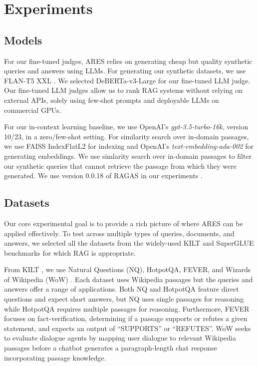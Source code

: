 
\section{Experiments}

\subsection{Models}
\label{sec:models}

For our fine-tuned judges,
ARES relies on generating cheap but quality synthetic queries and answers using LLMs.
For generating our synthetic datasets, we use FLAN-T5 XXL \cite{chung2022scaling}.
We selected DeBERTa-v3-Large \cite{he2021debertav3} for our fine-tuned LLM judge.
Our fine-tuned LLM judges allow us to rank RAG systems without relying on external APIs, solely using few-shot prompts and deployable LLMs on commercial GPUs.

For our in-context learning baseline, we use OpenAI's \textit{gpt-3.5-turbo-16k}, version 10/23, \cite{brown2020language} in a zero/few-shot setting.
For similarity search over in-domain passages, we use FAISS IndexFlatL2 for indexing \cite{johnson2019billion} and OpenAI's \textit{text-embedding-ada-002} for generating embeddings.
We use simlarity search over in-domain passages to filter our synthetic queries that cannot retrieve the passage from which they were generated.
We use version 0.0.18 of RAGAS in our experiments \cite{ragas2023}.



\subsection{Datasets}
\label{sec:datasets}

Our core experimental goal is to provide a rich picture of where ARES can be applied effectively.
To test across multiple types of queries, documents, and answers, 
we selected all the datasets from the widely-used KILT and SuperGLUE benchmarks for which RAG is appropriate.

From KILT \cite{petroni-etal-2021-kilt}, we use Natural Questions (NQ), HotpotQA, FEVER, and Wizards of Wikipedia (WoW) \cite{kwiatkowski2019natural, yang2018hotpotqa, fever-2023-fact, dinan2018wizard}. 
Each dataset uses Wikipedia passages but the queries and answers offer a range of applications.
Both NQ and HotpotQA feature direct questions and expect short answers, but NQ uses single passages for reasoning while HotpotQA requires multiple passages for reasoning.
Furthermore, FEVER focuses on fact-verification, determining if a passage supports or refutes a given statement, and expects an output of ``SUPPORTS'' or ``REFUTES''.
WoW seeks to evaluate dialogue agents by mapping user dialogue to relevant Wikipedia passages before a chatbot generates a paragraph-length chat response incorporating passage knowledge.

